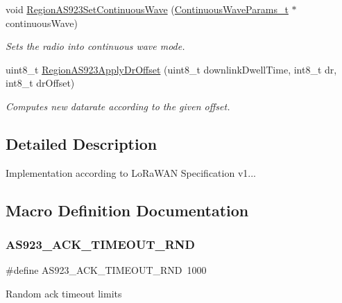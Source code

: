 \begin{DoxyCompactItemize}
void \hyperlink{group__REGIONAS923_ga295747645e6d5ed51a52cb17cee132b4}{Region\+A\+S923\+Set\+Continuous\+Wave} (\hyperlink{group__REGION_gaf39bb5ba06921139c6d17f88a8d518cd}{Continuous\+Wave\+Params\+\_\+t} $\ast$continuous\+Wave)
\begin{DoxyCompactList}\small\item\em Sets the radio into continuous wave mode. \end{DoxyCompactList}\item 
uint8\+\_\+t \hyperlink{group__REGIONAS923_gae3a2832d4cb1117e74dea4cdfe66998e}{Region\+A\+S923\+Apply\+Dr\+Offset} (uint8\+\_\+t downlink\+Dwell\+Time, int8\+\_\+t dr, int8\+\_\+t dr\+Offset)
\begin{DoxyCompactList}\small\item\em Computes new datarate according to the given offset. \end{DoxyCompactList}\end{DoxyCompactItemize}


\subsection{Detailed Description}
Implementation according to Lo\+Ra\+W\+AN Specification v1... 

\subsection{Macro Definition Documentation}
\mbox{\label{group__REGIONAS923_gae069e1d35da1a7303a5242bbada80740}} 
\subsubsection{\texorpdfstring{A\+S923\+\_\+\+A\+C\+K\+\_\+\+T\+I\+M\+E\+O\+U\+T\+\_\+\+R\+ND}{AS923\_ACK\_TIMEOUT\_RND}}
{\footnotesize\ttfamily \#define A\+S923\+\_\+\+A\+C\+K\+\_\+\+T\+I\+M\+E\+O\+U\+T\+\_\+\+R\+ND~1000}

Random ack timeout limits \mbox{\label{group__REGIONAS923_gad4cd8450319521a6db078659d7ee9f62}} 
